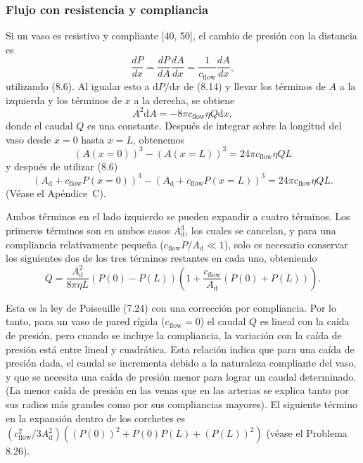 \documentclass[12pt]{book}
\begin{document}
\subsubsection*{Flujo con resistencia y compliancia}

Si un vaso es resistivo y compliante [40, 50], el cambio de presión con la distancia es
\begin{equation}
\frac{dP}{dx} = \frac{dP}{dA} \frac{dA}{dx} = \frac{1}{c_{\text{flow}}} \frac{dA}{dx},
\label{eq:815}
\end{equation}
utilizando (8.6). Al igualar esto a $\mathrm{d}P/\mathrm{d}x$ de (8.14) y llevar los términos de $A$ a la izquierda y los términos de $x$ a la derecha, se obtiene
\begin{equation}
A^2 \mathrm{d}A = -8\pi c_{\text{flow}} \eta Q \mathrm{d}x,
\label{eq:816}
\end{equation}
donde el caudal $Q$ es una constante. Después de integrar sobre la longitud del vaso desde $x = 0$ hasta $x = L$, obtenemos
\begin{equation}
(A(x = 0))^3 - (A(x = L))^3 = 24\pi c_{\text{flow}} \eta Q L
\label{eq:817}
\end{equation}
y después de utilizar (8.6)
\begin{equation}
(A_{\text{d}} + c_{\text{flow}} P(x = 0))^3 - (A_{\text{d}} + c_{\text{flow}} P(x = L))^3 = 24\pi c_{\text{flow}} \eta Q L.
\label{eq:818}
\end{equation}
(Véase el Apéndice~C).

Ambos términos en el lado izquierdo se pueden expandir a cuatro términos. Los primeros términos son en ambos casos $A_{\text{d}}^3$, los cuales se cancelan, y para una compliancia relativamente pequeña ($c_{\text{flow}} P/A_{\text{d}} \ll 1$), solo es necesario conservar los siguientes dos de los tres términos restantes en cada uno, obteniendo
\begin{equation}
Q = \frac{A_{\text{d}}^2}{8\pi\eta L} (P(0) - P(L))\left( 1 + \frac{c_{\text{flow}}}{A_{\text{d}}} (P(0) + P(L)) \right).
\label{eq:819}
\end{equation}

Esta es la ley de Poiseuille (7.24) con una corrección por compliancia. Por lo tanto, para un vaso de pared rígida ($c_{\text{flow}} = 0$) el caudal $Q$ es lineal con la caída de presión, pero cuando se incluye la compliancia, la variación con la caída de presión está entre lineal y cuadrática. Esta relación indica que para una caída de presión dada, el caudal se incrementa debido a la naturaleza compliante del vaso, y que se necesita una caída de presión menor para lograr un caudal determinado. (La menor caída de presión en las venas que en las arterias se explica tanto por sus radios más grandes como por sus compliancias mayores). El siguiente término en la expansión dentro de los corchetes es $\left(c_{\text{flow}}^2/3A_{\text{d}}^2\right)\left((P(0))^2 + P(0)P(L) + (P(L))^2\right)$ (véase el Problema 8.26).
\end{document}
